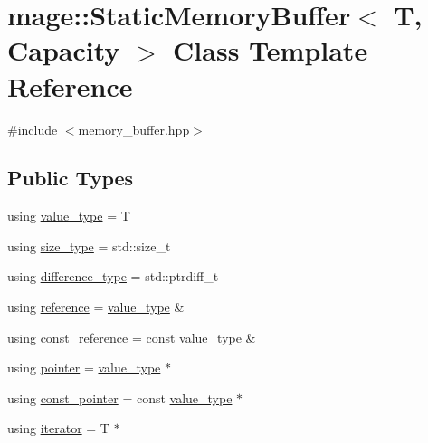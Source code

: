 \hypertarget{classmage_1_1_static_memory_buffer}{}\section{mage\+:\+:Static\+Memory\+Buffer$<$ T, Capacity $>$ Class Template Reference}
\label{classmage_1_1_static_memory_buffer}


{\ttfamily \#include $<$memory\+\_\+buffer.\+hpp$>$}

\subsection*{Public Types}
\begin{DoxyCompactItemize}
\item 
using \mbox{\hyperlink{classmage_1_1_static_memory_buffer_a30a2fd97f8f458d752581dd69e717a97}{value\+\_\+type}} = T
\item 
using \mbox{\hyperlink{classmage_1_1_static_memory_buffer_a13e19b7af61a49400c5be360f09aadc8}{size\+\_\+type}} = std\+::size\+\_\+t
\item 
using \mbox{\hyperlink{classmage_1_1_static_memory_buffer_a197f54439c47c9d72d1b6b181195a0fe}{difference\+\_\+type}} = std\+::ptrdiff\+\_\+t
\item 
using \mbox{\hyperlink{classmage_1_1_static_memory_buffer_ac00b0718b8b57bcaee2a7904637fc031}{reference}} = \mbox{\hyperlink{classmage_1_1_static_memory_buffer_a30a2fd97f8f458d752581dd69e717a97}{value\+\_\+type}} \&
\item 
using \mbox{\hyperlink{classmage_1_1_static_memory_buffer_a2d961d7baf56ebc96e1e48579bcdcb84}{const\+\_\+reference}} = const \mbox{\hyperlink{classmage_1_1_static_memory_buffer_a30a2fd97f8f458d752581dd69e717a97}{value\+\_\+type}} \&
\item 
using \mbox{\hyperlink{classmage_1_1_static_memory_buffer_a490e41a142c436086990f978d3c98c02}{pointer}} = \mbox{\hyperlink{classmage_1_1_static_memory_buffer_a30a2fd97f8f458d752581dd69e717a97}{value\+\_\+type}} $\ast$
\item 
using \mbox{\hyperlink{classmage_1_1_static_memory_buffer_adcb995de3155e5c1fb8c796465094577}{const\+\_\+pointer}} = const \mbox{\hyperlink{classmage_1_1_static_memory_buffer_a30a2fd97f8f458d752581dd69e717a97}{value\+\_\+type}} $\ast$
\item 
using \mbox{\hyperlink{classmage_1_1_static_memory_buffer_abeee1c933cd54117e1a92de4a1cc698f}{iterator}} = T $\ast$

\end{DoxyCompactItemize}
